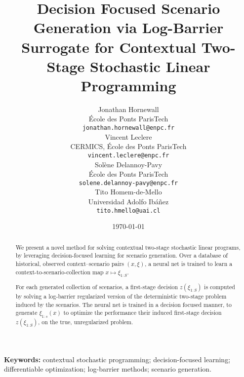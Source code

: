 \documentclass{article}
\title{Decision Focused Scenario Generation via Log-Barrier Surrogate for Contextual Two-Stage Stochastic Linear Programming}
\author{
Jonathan Hornewall \\
École des Ponts ParisTech \\
\texttt{jonathan.hornewall@enpc.fr} \\
\And
Vincent Leclere \\
CERMICS, École des Ponts ParisTech \\
\texttt{vincent.leclere@enpc.fr} \\
\And
Solène Delannoy-Pavy \\
École des Ponts ParisTech \\
\texttt{solene.delannoy-pavy@enpc.fr} \\
\And
Tito Homem-de-Mello \\
Universidad Adolfo Ibáñez \\
\texttt{tito.hmello@uai.cl} \\
}
\date{\today}
\begin{document}
\maketitle

\begin{abstract}
We present a novel method for solving contextual two-stage stochastic linear programs, by leveraging decision-focused learning for scenario generation. 
Over a database of historical, observed context–scenario pairs $(x,\xi)$,  a neural net is trained to learn a context-to-scenario-collection map $x  \mapsto \xi_{1:S}$. 



For each generated collection of scenarios, a first-stage decision $z(\xi_{1:S})$ is computed by solving a log-barrier regularized version of the deterministic two-stage problem induced by the scenarios.
The neural net is trained in a decision focused manner, to generate $\xi_{1:s}(x)$ to optimize the performance their induced first-stage decision $z(\xi_{1:S})$, on the true, unregularized problem.




\end{abstract}

\noindent\textbf{Keywords:} contextual stochastic programming; decision-focused learning; differentiable optimization; log-barrier methods; scenario generation.
\end{document}
